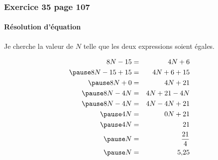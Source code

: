 \documentclass[xcolor={dvipsnames}]{beamer}
\begin{document}
\begin{frame}
\frametitle{Exercice 35 page 107}
\framesubtitle{Résolution d'équation}

	Je cherche la valeur de $N$ telle que les deux expressions soient égales. \pause
	
	\begin{eqnarray*}
		8N - 15 &=& 4N + 6 \\ \pause %
		8N - 15 + 15 &=& 4N + 6 + 15 \\ \pause %
		8N + 0 &=& 4N + 21 \\ \pause %
		8N - 4N &=& 4N + 21 -4N \\ \pause %
		8N - 4N &=& 4N -4N + 21 \\ \pause %
		4N &=& 0N + 21 \\ \pause %
		4N &=& 21 \\ \pause %
		N &=& \frac{21}{4} \\ \pause %
		N &=& \num{5.25}
	\end{eqnarray*}
	
\end{frame}
\end{document}
